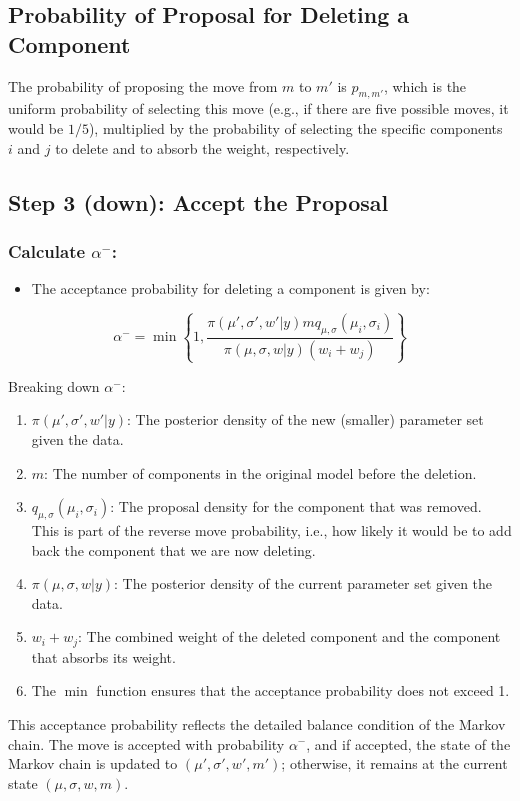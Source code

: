 \documentclass[10pt]{article}
\begin{document}
\subsection*{Probability of Proposal for Deleting a Component}
The probability of proposing the move from \( m \) to \( m' \) is \( p_{m,m'} \), which is the uniform probability of selecting this move (e.g., if there are five possible moves, it would be \( 1/5 \)), multiplied by the probability of selecting the specific components \( i \) and \( j \) to delete and to absorb the weight, respectively.

\subsection*{Step 3 (down): Accept the Proposal}

\subsubsection*{Calculate \( \alpha^- \):}
\begin{itemize}
  \item The acceptance probability for deleting a component is given by:
\end{itemize}

\[ \alpha^- = \min \left\{ 1, \frac{\pi(\mu', \sigma', w'|y)mq_{\mu,\sigma}(\mu_i, \sigma_i)}{\pi(\mu, \sigma, w|y)(w_i + w_j)} \right\} \]

Breaking down \( \alpha^- \):

\begin{enumerate}
  \item \( \pi(\mu', \sigma', w'|y) \): The posterior density of the new (smaller) parameter set given the data.

  \item \( m \): The number of components in the original model before the deletion.

  \item \( q_{\mu,\sigma}(\mu_i, \sigma_i) \): The proposal density for the component that was removed. This is part of the reverse move probability, i.e., how likely it would be to add back the component that we are now deleting.

  \item \( \pi(\mu, \sigma, w|y) \): The posterior density of the current parameter set given the data.

  \item \( w_i + w_j \): The combined weight of the deleted component and the component that absorbs its weight.

  \item The \( \min \) function ensures that the acceptance probability does not exceed 1.

\end{enumerate}

This acceptance probability reflects the detailed balance condition of the Markov chain. The move is accepted with probability \( \alpha^- \), and if accepted, the state of the Markov chain is updated to \( (\mu', \sigma', w', m') \); otherwise, it remains at the current state \( (\mu, \sigma, w, m) \).
\end{document}
